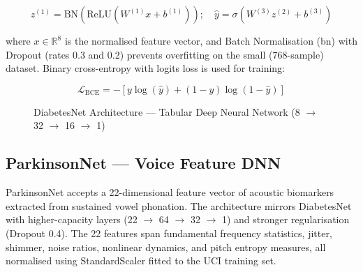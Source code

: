 \begin{equation}
	z^{(1)} = \text{BN}(\text{ReLU}(W^{(1)}x + b^{(1)})); \quad \hat{y} = \sigma(W^{(3)}z^{(2)} + b^{(3)})
\end{equation}

where $x \in \mathbb{R}^8$ is the normalised feature vector, and Batch Normalisation (\ac{bn}) with Dropout (rates 0.3 and 0.2) prevents overfitting on the small (768-sample) dataset. Binary cross-entropy with logits loss is used for training:

\begin{equation}
	\mathcal{L}_{\text{BCE}} = -[y \log(\hat{y}) + (1-y) \log(1-\hat{y})]
\end{equation}

\begin{figure}[h!]
\centering
{}
\caption[DiabetesNet Architecture]{DiabetesNet Architecture --- Tabular Deep Neural Network (8 $\rightarrow$ 32 $\rightarrow$ 16 $\rightarrow$ 1)}
\label{fig:diabetesnet}
\end{figure}

\subsection{ParkinsonNet — Voice Feature DNN}

ParkinsonNet accepts a 22-dimensional feature vector of acoustic biomarkers extracted from sustained vowel phonation. The architecture mirrors DiabetesNet with higher-capacity layers (22 $\rightarrow$ 64 $\rightarrow$ 32 $\rightarrow$ 1) and stronger regularisation (Dropout 0.4). The 22 features span fundamental frequency statistics, jitter, shimmer, noise ratios, nonlinear dynamics, and pitch entropy measures, all normalised using StandardScaler fitted to the UCI training set.

